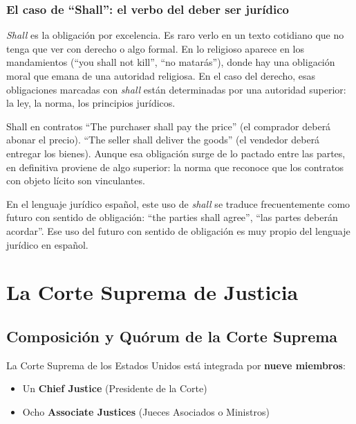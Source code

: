 \documentclass[12pt,oneside]{book}
\begin{document}
\subsection{El caso de ``Shall'': el verbo del deber ser jurídico}

\textit{Shall} es la obligación por excelencia. Es raro verlo en un texto cotidiano que no tenga que ver con derecho o algo formal. En lo religioso aparece en los mandamientos (``you shall not kill'', ``no matarás''), donde hay una obligación moral que emana de una autoridad religiosa. En el caso del derecho, esas obligaciones marcadas con \textit{shall} están determinadas por una autoridad superior: la ley, la norma, los principios jurídicos.

\begin{example}{Shall en contratos}
``The purchaser shall pay the price'' (el comprador deberá abonar el precio). ``The seller shall deliver the goods'' (el vendedor deberá entregar los bienes). Aunque esa obligación surge de lo pactado entre las partes, en definitiva proviene de algo superior: la norma que reconoce que los contratos con objeto lícito son vinculantes.
\end{example}

En el lenguaje jurídico español, este uso de \textit{shall} se traduce frecuentemente como futuro con sentido de obligación: ``the parties shall agree'', ``las partes deberán acordar''. Ese uso del futuro con sentido de obligación es muy propio del lenguaje jurídico en español.

\newpage

\chapter{La Corte Suprema de Justicia}

\section{Composición y Quórum de la Corte Suprema}

La Corte Suprema de los Estados Unidos está integrada por \textbf{nueve miembros}:

\begin{itemize}
    \item Un \textbf{Chief Justice} (Presidente de la Corte)
    \item Ocho \textbf{Associate Justices} (Jueces Asociados o Ministros)
\end{itemize}
\end{document}
